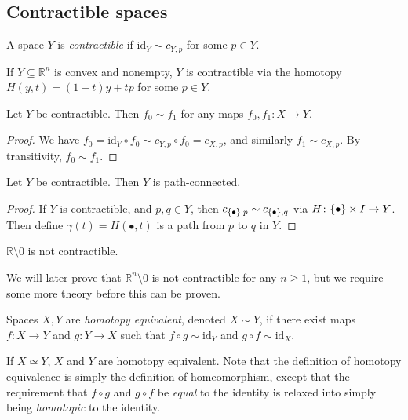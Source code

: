 \subsection{Contractible spaces}
\begin{definition}
	A space \( Y \) is \emph{contractible} if \( \mathrm{id}_Y \sim c_{Y,p} \) for some \( p \in Y \).
\end{definition}
\begin{example}
	If \( Y \subseteq \mathbb R^n \) is convex and nonempty, \( Y \) is contractible via the homotopy \( H(y,t) = (1-t)y + tp \) for some \( p \in Y \).
\end{example}
\begin{proposition}
	Let \( Y \) be contractible.
	Then \( f_0 \sim f_1 \) for any maps \( f_0, f_1 \colon X \to Y \).
\end{proposition}
\begin{proof}
	We have \( f_0 = \mathrm{id}_Y \circ f_0 \sim c_{Y,p} \circ f_0 = c_{X,p} \), and similarly \( f_1 \sim c_{X,p} \).
	By transitivity, \( f_0 \sim f_1 \).
\end{proof}
\begin{corollary}
	Let \( Y \) be contractible.
	Then \( Y \) is path-connected.
\end{corollary}
\begin{proof}
	If \( Y \) is contractible, and \( p, q \in Y \), then \( c_{\qty{\bullet},p} \sim c_{\qty{\bullet},q} \) via \( H \colon \qty{\bullet} \times I \to Y \).
	Then define \( \gamma(t) = H(\bullet,t) \) is a path from \( p \) to \( q \) in \( Y \).
\end{proof}
\begin{example}
	\( \mathbb R \setminus \qty{0} \) is not contractible.
\end{example}
We will later prove that \( \mathbb R^n \setminus \qty{0} \) is not contractible for any \( n \geq 1 \), but we require some more theory before this can be proven.
\begin{definition}
	Spaces \( X, Y \) are \emph{homotopy equivalent}, denoted \( X \sim Y \), if there exist maps \( f \colon X \to Y \) and \( g \colon Y \to X \) such that \( f \circ g \sim \mathrm{id}_Y \) and \( g \circ f \sim \mathrm{id}_X \).
\end{definition}
\begin{example}
	If \( X \simeq Y \), \( X \) and \( Y \) are homotopy equivalent.
	Note that the definition of homotopy equivalence is simply the definition of homeomorphism, except that the requirement that \( f \circ g \) and \( g \circ f \) be \emph{equal} to the identity is relaxed into simply being \emph{homotopic} to the identity.
\end{example}
